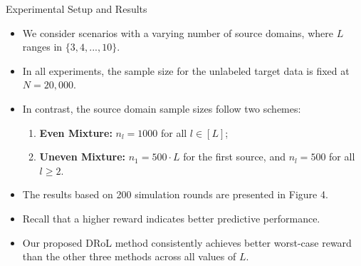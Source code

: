 \documentclass{beamer}
\begin{document}
\begin{frame}{Experimental Setup and Results}
    \begin{itemize}
        \item We consider scenarios with a varying number of source domains, where $L$ ranges in $\{3, 4, ..., 10\}$.
        \item In all experiments, the sample size for the unlabeled target data is fixed at $N = 20,000$.
        \item In contrast, the source domain sample sizes follow two schemes:
        \begin{enumerate}
            \item \textbf{Even Mixture:} $n_{l} = 1000$ for all $l \in [L]$;
            \item \textbf{Uneven Mixture:} $n_{1} = 500 \cdot L$ for the first source, and $n_{l} = 500$ for all $l \geq 2$.
        \end{enumerate}
        \item The results based on 200 simulation rounds are presented in Figure 4.
        \item Recall that a higher reward indicates better predictive performance.
        \item Our proposed DRoL method consistently achieves better worst-case reward than the other three methods across all values of $L$.
    \end{itemize}
\end{frame}
\end{document}
